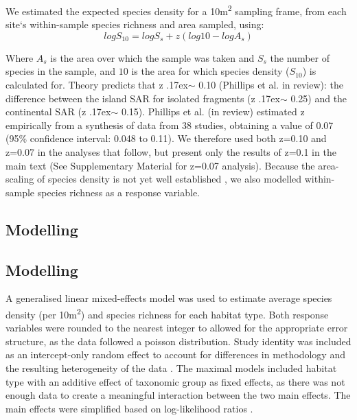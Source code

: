 We estimated the expected species density for a 10m\textsuperscript{2} sampling frame, from each site`s within-sample species richness and area sampled, using: 
\begin{equation}
log S_{10} = log S_s + z(log 10 - log A_s)
\end{equation}


Where $A_s$ is the area over which the sample was taken and $S_s$ the number of species in the sample, and $10$ is the area for which species density ($S_{10}$) is calculated for. Theory predicts that z {\raise.17ex\hbox{$\scriptstyle\sim$}} 0.10 (Phillips et al. in review): the difference between the island SAR for isolated fragments (z {\raise.17ex\hbox{$\scriptstyle\sim$}} 0.25) and the continental SAR (z {\raise.17ex\hbox{$\scriptstyle\sim$}} 0.15). Phillips et al. (in review) estimated z empirically from a synthesis of data from 38 studies, obtaining a value of 0.07 (95\% confidence interval: 0.048 to 0.11). We therefore used both z=0.10 and z=0.07 in the analyses that follow, but present only the results of z=0.1 in the main text (See Supplementary Material for z=0.07 analysis).  Because the area-scaling of species density is not yet well established \citep[e.g.][]{Giladi:2014bio}, we also modelled within-sample species richness as a response variable.

\ifappendixStyle %
\subsection{Modelling}%
\else
\subsection*{Modelling}
\fi

A generalised linear mixed-effects model was used to estimate average species density (per 10m\textsuperscript{2}) and species richness for each habitat type. Both response variables were rounded to the nearest integer to allowed for the appropriate error structure, as the data followed a poisson distribution. Study identity was included as an intercept-only random effect to account for differences in methodology and the resulting heterogeneity of the data \citep{Zuur:2009me}. The maximal models included habitat type with an additive effect of taxonomic group as fixed effects, as there was not enough data to create a meaningful interaction between the two main effects. The main effects were simplified based on log-likelihood ratios \citep{Zuur:2009me,Crawley:2012r}.

